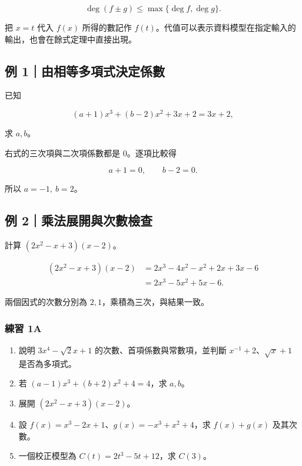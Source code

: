\documentclass[11pt,a4paper]{article}
\providecommand{\tightlist}{%
  \setlength{\itemsep}{0pt}\setlength{\parskip}{0pt}}
\begin{document}
\[
\deg(f\pm g)\le \max\{\deg f,\deg g\}.
\]

把 \(x=t\) 代入 \(f(x)\) 所得的數記作 \(f(t)\)。代值可以表示資料模型在指定輸入的輸出，也會在餘式定理中直接出現。

\subsection{例 1｜由相等多項式決定係數}\label{ux4f8b-1ux7531ux76f8ux7b49ux591aux9805ux5f0fux6c7aux5b9aux4fc2ux6578}

已知

\[
(a+1)x^3+(b-2)x^2+3x+2=3x+2,
\]

求 \(a,b\)。

右式的三次項與二次項係數都是 \(0\)。逐項比較得

\[
a+1=0,\qquad b-2=0.
\]

所以 \(\boxed{a=-1,\ b=2}\)。

\subsection{例 2｜乘法展開與次數檢查}\label{ux4f8b-2ux4e58ux6cd5ux5c55ux958bux8207ux6b21ux6578ux6aa2ux67e5}

計算 \((2x^2-x+3)(x-2)\)。

\[
\begin{aligned}
(2x^2-x+3)(x-2)
&=2x^3-4x^2-x^2+2x+3x-6\\
&=\boxed{2x^3-5x^2+5x-6}.
\end{aligned}
\]

兩個因式的次數分別為 \(2,1\)，乘積為三次，與結果一致。

\subsubsection{練習 1A}\label{ux7df4ux7fd2-1a}

\begin{enumerate}
\def\labelenumi{\arabic{enumi}.}
\tightlist
\item
  說明 \(3x^4-\sqrt2x+1\) 的次數、首項係數與常數項，並判斷 \(x^{-1}+2\)、\(\sqrt{x}+1\) 是否為多項式。
\item
  若 \((a-1)x^3+(b+2)x^2+4=4\)，求 \(a,b\)。
\item
  展開 \((2x^2-x+3)(x-2)\)。
\item
  設 \(f(x)=x^3-2x+1\)、\(g(x)=-x^3+x^2+4\)，求 \(f(x)+g(x)\) 及其次數。
\item
  一個校正模型為 \(C(t)=2t^3-5t+12\)，求 \(C(3)\)。
\end{enumerate}
\end{document}
